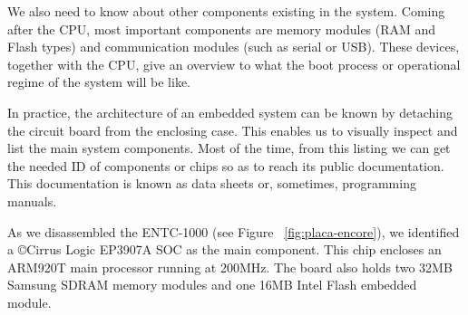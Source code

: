 \documentclass[conference]{IEEEtran}
\newcommand{\nota}[1]{}
\begin{document}
We also need to know about other components existing in the system. Coming after the CPU, most important components are memory modules (RAM and Flash types) and communication modules (such as serial or USB). These devices, together with the CPU, give an overview to what the boot process or operational regime of the system will be like.

\nota {En la práctica, la arquitectura de un sistema embebido particular puede conocerse desmontando
la placa del circuito impreso de la caja exterior. Esto posibilita
inspeccionar visualmente y listar todos los componentes principales con los
que está compuesto el sistema. A partir de este listado, puede
obtenerse, en la mayoría de los casos, la documentación pública
de cada uno de los componentes o chips listados.
A este tipo de documentación se conoce como hoja de datos, o
en algunos casos (como el de las memorias o CPU) manuales de programación
del chip.}

In practice, the architecture of an embedded system can be known by detaching the circuit board from the enclosing case. This enables us to visually inspect and list the main system components. Most of the time, from this listing we can get the needed ID of components or chips so as to reach its public documentation. This documentation is known as data sheets or, sometimes, programming manuals.


\nota { 
En nuestro caso de estudio, al desmontar el ENTC-1000 (ver la Figura ~\ref{fig:placa-encore} )
, identificamos
un SOC Cirrus Logic \copyright EP3907A como el componente principal,
que contiene un procesador central de arquitectura ARM, modelo ARM920T
a una velocidad de 200Mhz.
Además, la placa presenta dos módulos de memoria SDRAM Samsung de 32MB cada uno, y un modulo
de memoria Flash embebida INTEL de 16MB.
}

As we disassembled the ENTC-1000 (see Figure ~\ref{fig:placa-encore}), we identified a \copyright Cirrus Logic EP3907A SOC as the main component. This chip encloses an ARM920T main processor running at 200MHz. The board also holds two 32MB Samsung SDRAM memory modules and one 16MB Intel Flash embedded module.
\end{document}
